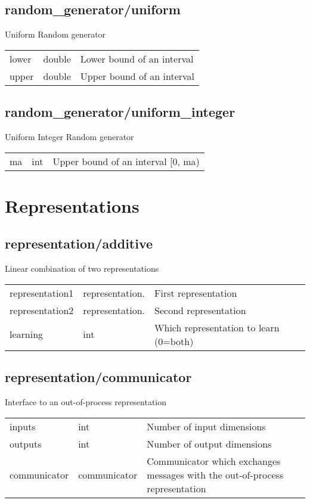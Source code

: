 \subsection{random\_generator/uniform}
\noindent Uniform Random generator\\

\noindent\begin{tabular}{@{}lll@{}}
lower&double&Lower bound of an interval\\
upper&double&Upper bound of an interval\\
\end{tabular}
\subsection{random\_generator/uniform\_integer}
\noindent Uniform Integer Random generator\\

\noindent\begin{tabular}{@{}lll@{}}
ma&int&Upper bound of an interval [0, ma)\\
\end{tabular}
\section{Representations}
\subsection{representation/additive}
\noindent Linear combination of two representations\\

\noindent\begin{tabular}{@{}lll@{}}
representation1&representation.&First representation\\
representation2&representation.&Second representation\\
learning&int&Which representation to learn (0=both)\\
\end{tabular}
\subsection{representation/communicator}
\noindent Interface to an out-of-process representation\\

\noindent\begin{tabular}{@{}lll@{}}
inputs&int&Number of input dimensions\\
outputs&int&Number of output dimensions\\
communicator&communicator&Communicator which exchanges messages with the out-of-process representation\\
\end{tabular}
